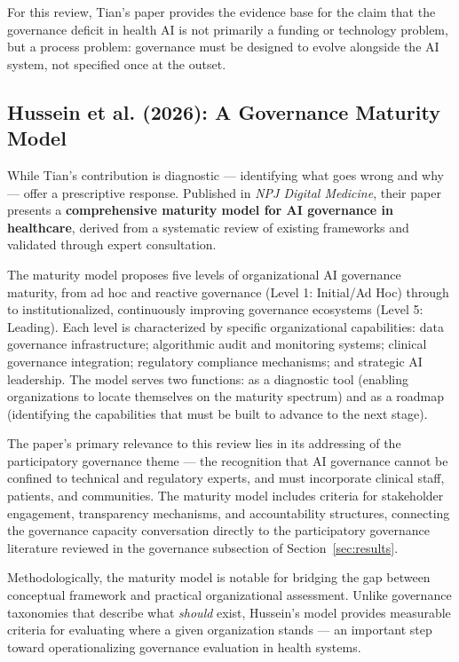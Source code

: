 For this review, Tian's paper provides the evidence base for the claim
that the governance deficit in health AI is not primarily a funding or
technology problem, but a process problem: governance must be designed
to evolve alongside the AI system, not specified once at the outset.

\subsection{Hussein et al. (2026): A Governance Maturity Model}
\label{sec:hussein}

While Tian's contribution is diagnostic — identifying what goes wrong
and why — \citet{hussein2026governance} offer a prescriptive response.
Published in \textit{NPJ Digital Medicine}, their paper presents a
\textbf{comprehensive maturity model for AI governance in healthcare},
derived from a systematic review of existing frameworks and validated
through expert consultation.

The maturity model proposes five levels of organizational AI governance
maturity, from ad hoc and reactive governance (Level 1: Initial/Ad Hoc)
through to institutionalized, continuously improving governance ecosystems
(Level 5: Leading).
Each level is characterized by specific organizational capabilities:
data governance infrastructure; algorithmic audit and monitoring systems;
clinical governance integration; regulatory compliance mechanisms; and
strategic AI leadership. The model serves two functions: as a diagnostic
tool (enabling organizations to locate themselves on the maturity
spectrum) and as a roadmap (identifying the capabilities that must be
built to advance to the next stage).

The paper's primary relevance to this review lies in its addressing
of the participatory governance theme — the recognition that AI governance
cannot be confined to technical and regulatory experts, and must incorporate
clinical staff, patients, and communities. The maturity model includes
criteria for stakeholder engagement, transparency mechanisms, and
accountability structures, connecting the governance capacity conversation
directly to the participatory governance literature reviewed in the
governance subsection of Section~\ref{sec:results}.

Methodologically, the maturity model is notable for bridging the gap
between conceptual framework and practical organizational assessment.
Unlike governance taxonomies that describe what \textit{should} exist,
Hussein's model provides measurable criteria for evaluating where
a given organization stands — an important step toward operationalizing
governance evaluation in health systems.

